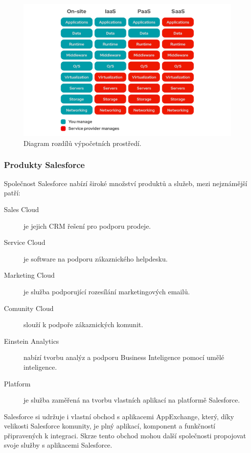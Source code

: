 \begin{figure}[!h]
    \centering
    \includegraphics[width=\textwidth]{assets/2_IS/iaas-paas-saas-diagram.png}
    \caption[Diagram rozdílů výpočetních prostředí.]{Diagram rozdílů výpočetních prostředí. \cite{RedHatIaasPaasSaas}}
    \label{fig:IaasPaasSaas}
\end{figure}
\FloatBarrier
\subsubsection{Produkty Salesforce}
Společnost Salesforce nabízí široké množství produktů a služeb, mezi nejznámější patří:
\begin{description}
    \item [Sales Cloud] je jejich CRM řešení pro podporu prodeje.
    \item [Service Cloud] je software na podporu zákaznického helpdesku.
    \item [Marketing Cloud] je služba podporující rozesílání marketingových emailů.
    \item [Comunity Cloud] slouží k podpoře zákaznických komunit.
    \item [Einstein Analytics] nabízí tvorbu analýz a podporu Business Inteligence pomocí umělé inteligence.
    \item [Platform] je služba zaměřená na tvorbu vlastních aplikací na platformě Salesforce.
\end{description}

Salesforce si udržuje i vlastní obchod s aplikacemi AppExchange, který, díky velikosti Salesforce komunity, je plný aplikací, komponent a funkčností připravených k integraci. Skrze tento obchod mohou další společnosti propojovat svoje služby s aplikacemi Salesforce. \cite{PCMagSalesforceReview}

